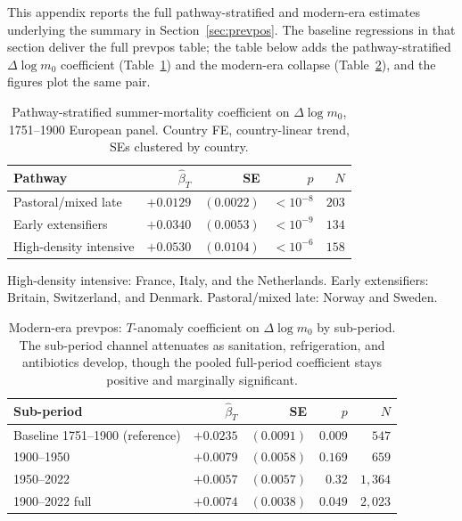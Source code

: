 \documentclass[11pt,letterpaper]{article}
\begin{document}
This appendix reports the full pathway-stratified and modern-era estimates underlying the summary in Section~\ref{sec:prevpos}. The baseline regressions in that section deliver the full prevpos table; the table below adds the pathway-stratified $\Delta \log m_0$ coefficient (Table~\ref{tab:prevpos-pathway}) and the modern-era collapse (Table~\ref{tab:prevpos-modern}), and the figures plot the same pair.

\begin{table}[H]
\centering
\caption{Pathway-stratified summer-mortality coefficient on $\Delta \log m_0$, 1751--1900 European panel. Country FE, country-linear trend, SEs clustered by country.}
\label{tab:prevpos-pathway}
\small
\begin{tabular}{lrrrr}
\toprule
Pathway & $\hat\beta_T$ & SE & $p$ & $N$ \\
\midrule
Pastoral/mixed late      & $+0.0129$ & $(0.0022)$ & $<10^{-8}$ & $203$ \\
Early extensifiers       & $+0.0340$ & $(0.0053)$ & $<10^{-9}$ & $134$ \\
High-density intensive   & $+0.0530$ & $(0.0104)$ & $<10^{-6}$ & $158$ \\
\bottomrule
\end{tabular}
\par\smallskip\footnotesize{High-density intensive: France, Italy, and the Netherlands. Early extensifiers: Britain, Switzerland, and Denmark. Pastoral/mixed late: Norway and Sweden.}
\end{table}

\begin{table}[H]
\centering
\caption{Modern-era prevpos: $T$-anomaly coefficient on $\Delta \log m_0$ by sub-period. The sub-period channel attenuates as sanitation, refrigeration, and antibiotics develop, though the pooled full-period coefficient stays positive and marginally significant.}
\label{tab:prevpos-modern}
\small
\begin{tabular}{lrrrr}
\toprule
Sub-period & $\hat\beta_T$ & SE & $p$ & $N$ \\
\midrule
Baseline 1751--1900 (reference) & $+0.0235$ & $(0.0091)$ & $0.009$ & $547$ \\
1900--1950 & $+0.0079$ & $(0.0058)$ & $0.169$ & $659$ \\
1950--2022 & $+0.0057$ & $(0.0057)$ & $0.32$ & $1{,}364$ \\
1900--2022 full & $+0.0074$ & $(0.0038)$ & $0.049$ & $2{,}023$ \\
\bottomrule
\end{tabular}
\end{table}
\end{document}
